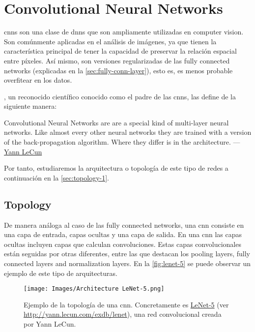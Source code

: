 \section{Convolutional Neural Networks}
\label{sec:conv-neur-netw}

\glspl{cnn} son una clase de \glspl{dnn} que son ampliamente utilizadas en
computer vision. Son comúnmente aplicadas en el análisis de imágenes, ya que
tienen la característica principal de tener la capacidad de preservar la
relación espacial entre píxeles. Así mismo, son versiones regularizadas de las
fully connected networks (explicadas en la \vref{sec:fully-conn-layer}), esto
es, es menos probable overfitear en los datos.

, un reconocido científico
conocido como el padre de las \glspl{cnn}, las define de la siguiente manera:
\begin{quoteBox}
  Convolutional Neural Networks are are a special kind of multi-layer neural
  networks. Like almost every other neural networks they are trained with a
  version of the back-propagation algorithm. Where they differ is in the
  architecture.
  \tcblower
  ---\href{http://yann.lecun.com/index.html}{Yann LeCun}
\end{quoteBox}

Por tanto, estudiaremos la arquitectura o topología de este tipo de redes a
continuación en la \vref{sec:topology-1}.

\subsection{Topology} \label{sec:topology-1}

De manera análoga al caso de las fully connected networks, una \gls{cnn}
consiste en una capa de entrada, capas ocultas y una capa de salida. En una
\gls{cnn} las capas ocultas incluyen capas que calculan convoluciones. Estas
capas convolucionales están seguidas por otras diferentes, entre las que
destacan los pooling layers, fully connected layers and normalization
layers. En la \vref{fig:lenet-5} se puede observar un ejemplo de este
tipo de arquitecturas.

\begin{figure}[ht]
  \centering
  \texttt{[image: Images/Architecture LeNet-5.png]}
  \caption[Ejemplo de topología de una \acs*{cnn} (LeNet-5)]{Ejemplo de la
    topología de una \gls{cnn}. Concretamente es
    \href{http://yann.lecun.com/exdb/lenet}{LeNet-5} (ver
    \url{http://yann.lecun.com/exdb/lenet}), una red convolucional creada por
    Yann LeCun.}
  \label{fig:lenet-5}
\end{figure}

